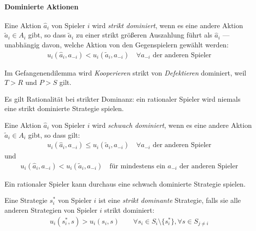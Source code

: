 \paragraph{Dominierte Aktionen}%
\label{par:dominierte_aktionen}

\begin{definition}
  \label{def:strikte_domination}
  Eine Aktion $\hat{a}_i$ von Spieler $i$ wird \emph{strikt dominiert},
  wenn es eine andere Aktion $\tilde{a}_i \in A_i$ gibt,
  so dass $\tilde{a}_i$ zu einer strikt größeren Auszahlung führt als $\hat{a}_i$
  — unabhängig davon, welche Aktion von den Gegenspielern gewählt werden:
  \begin{align*}
    u_i(\hat{a}_i, a_{-i}) < u_i(\tilde{a}_i, a_{-i})
    \quad
    \forall a_{-i} \text{ der anderen Spieler}
  \end{align*}
\end{definition}

Im Gefangenendilemma wird \emph{Kooperieren} strikt von \emph{Defektieren} dominiert, weil
$T > R$ und $P > S$ gilt.

Es gilt Rationalität bei strikter Dominanz: ein rationaler Spieler wird niemals eine
strikt dominierte Strategie spielen.

\begin{definition}
  \label{def:schwache_dominanz}
  Eine Aktion $\hat{a}_i$ von Spieler $i$ wird \emph{schwach dominiert}, wenn es eine
  andere Aktion $\tilde{a}_i \in A_i$ gibt, so dass gilt:
  \begin{align*}
    u_i(\hat{a}_i, a_{-i}) \leq u_i(\tilde{a}_i, a_{-i})
    \quad \forall a_{-i} \text{ der anderen Spieler}
  \end{align*}
  und
  \begin{align*}
    u_i(\hat{a}_i, a_{-i}) < u_i(\tilde{a}_i, a_{-i})
    \quad \text{für mindestens ein $a_{-i}$ der anderen Spieler}
  \end{align*}
\end{definition}

Ein rationaler Spieler kann durchaus eine schwach dominierte Strategie spielen.

\begin{definition}
  \label{def:strikt_dominante_strategie}
  Eine Strategie $s^*_i$ von Spieler $i$ ist eine \emph{strikt dominante} Strategie, falls
  sie alle anderen Strategien von Spieler $i$ strikt dominiert:
  \begin{align*}
    u_i(s^*_i, s) > u_i(s_i, s) \qquad
    \forall s_i \in S_i \setminus \{s^*_i\},
    \forall s \in S_{j \neq i}
  \end{align*}
\end{definition}

